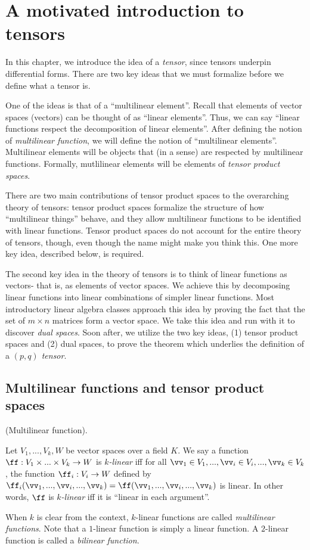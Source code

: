 \chapter{A motivated introduction to tensors}
\label{ch::motivated_intro}

In this chapter, we introduce the idea of a \textit{tensor}, since tensors underpin differential forms. There are two key ideas that we must formalize before we define what a tensor is.

One of the ideas is that of a ``multilinear element''. Recall that elements of vector spaces (vectors) can be thought of as ``linear elements''. Thus, we can say ``linear functions respect the decomposition of linear elements''. After defining the notion of \textit{multilinear function}, we will define the notion of ``multilinear elements''. Multilinear elements will be objects that (in a sense) are respected by multilinear functions. Formally, mutlilinear elements will be elements of \textit{tensor product spaces}. 

There are two main contributions of tensor product spaces to the overarching theory of tensors: tensor product spaces formalize the structure of how ``multilinear things'' behave, and they allow multilinear functions to be identified with linear functions. Tensor product spaces do not account for the entire theory of tensors, though, even though the name might make you think this. One more key idea, described below, is required.

The second key idea in the theory of tensors is to think of linear functions as vectors- that is, as elements of vector spaces. We achieve this by decomposing linear functions into linear combinations of simpler linear functions. Most introductory linear algebra classes approach this idea by proving the fact that the set of $m \times n$ matrices form a vector space. We take this idea and run with it to discover \textit{dual spaces}. Soon after, we utilize the two key ideas, (1) tensor product spaces and (2) dual spaces, to prove the theorem which underlies the definition of a \textit{$(p, q)$ tensor}.

\section{Multilinear functions and tensor product spaces}

\begin{defn}
    (Multilinear function).
    
    Let $V_1, ..., V_k, W$ be vector spaces over a field $K$. We say a function $\ff:V_1 \times ... \times V_k \rightarrow W$ is \textit{$k$-linear} iff for all $\vv_1 \in V_1, ..., \vv_i \in V_i, ..., \vv_k \in V_k$, the function $\ff_i:V_i \rightarrow W$ defined by $\ff_i(\vv_1, ..., \vv_i, ..., \vv_k) = \ff(\vv_1, ..., \vv_i, ..., \vv_k)$ is linear. In other words, $\ff$ is \textit{$k$-linear} iff it is ``linear in each argument''. 
    
    When $k$ is clear from the context, $k$-linear functions are called \textit{multilinear functions}. Note that a $1$-linear function is simply a linear function. A $2$-linear function is called a \textit{bilinear function}.
\end{defn}

